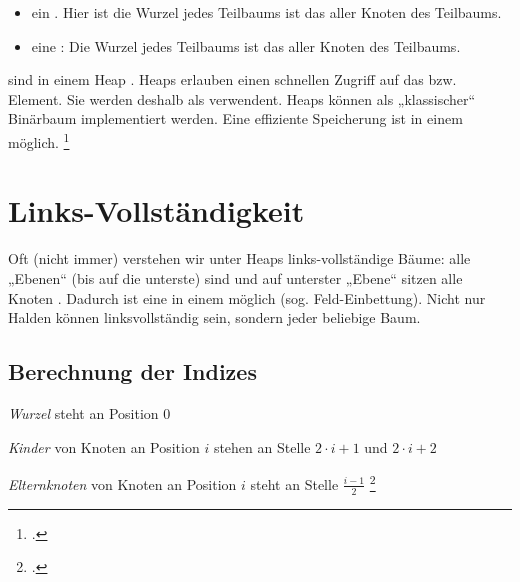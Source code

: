 \documentclass{bschlangaul-theorie}
\begin{document}
\begin{itemize}
\item ein . Hier ist die Wurzel jedes Teilbaums ist das
 aller Knoten des Teilbaums.
%
\item eine : Die Wurzel jedes Teilbaums ist das
 aller Knoten des Teilbaums.
\end{itemize}
%
 sind in einem Heap .
%
Heaps erlauben einen schnellen Zugriff auf das  bzw.
 Element. Sie werden deshalb als
 verwendent.
%
Heaps können als „klassischer“ Binärbaum implementiert werden. Eine
effiziente Speicherung ist in einem  möglich.
\footcite[Seite 22]{aud:fs:tafeluebung-11}

%

\section{Links-Vollständigkeit}

Oft (nicht immer) verstehen wir unter Heaps links-vollständige Bäume:
\dh alle „Ebenen“ (bis auf die unterste) sind 
und auf unterster „Ebene“ sitzen alle Knoten . Dadurch ist eine  in einem
 möglich (sog. Feld-Einbettung). Nicht nur Halden können
linksvollständig sein, sondern jeder beliebige Baum.

%

\subsection{Berechnung der Indizes}

\begin{compactitem}
\item \emph{Wurzel} steht an Position $0$

\item \emph{Kinder} von Knoten an Position $i$ stehen an Stelle
$2 \cdot i + 1$ und $2 \cdot i + 2$

\item \emph{Elternknoten} von Knoten an Position $i$ steht an Stelle
$\frac{i - 1}{2}$
\footcite[Seite 26]{aud:fs:tafeluebung-11}
\end{compactitem}
\end{document}
